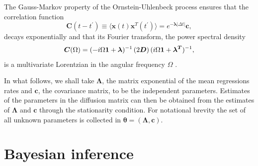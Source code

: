 \documentclass[english,aps, twocolumn, pre,superscriptaddress, notitlepage]{revtex4-1}
\begin{document}
The Gauss-Markov property of the Ornstein-Uhlenbeck process ensures
that the correlation function
\begin{equation}
\boldsymbol{C}(t-t^{\prime})\equiv\langle\boldsymbol{x}(t)\boldsymbol{x}^{T}(t^{\prime})\rangle=e^{-\boldsymbol{\lambda}|\Delta t|}\boldsymbol{c},\mathbf{}\label{eq:autocorr}
\end{equation}
decays exponentially and that its Fourier transform, the power spectral
density
\begin{equation}
\boldsymbol{C}(\Omega)=(\text{\textminus}i\Omega\boldsymbol{1}+\boldsymbol{\lambda})^{-1}\left(2\boldsymbol{D}\right)(i\Omega\boldsymbol{1}+\boldsymbol{\lambda^{T}})^{-1},\label{eq:spectral-density}
\end{equation}
is a multivariate Lorentzian in the angular frequency $\Omega$ \cite{van1992stochastic}. 

In what follows, we shall take $\boldsymbol{\Lambda}$, the matrix
exponential of the mean regressions rates and $\boldsymbol{c}$, the
covariance matrix, to be the independent parameters. Estimates of
the parameters in the diffusion matrix can then be obtained from the
estimates of $\boldsymbol{\Lambda}$ and $\boldsymbol{c}$ through
the stationarity condition. For notational brevity the set of all
unknown parameters is collected in $\boldsymbol{\theta}=(\boldsymbol{\Lambda},\boldsymbol{c})$. 

\section{Bayesian inference\label{sec:Bayesian-inference}}
\end{document}
